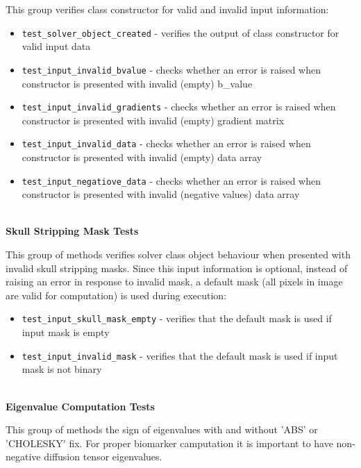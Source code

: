 This group verifies class constructor for valid and invalid input information:

\begin{itemize}
	\item 
	\texttt{test\_solver\_object\_created} - verifies the output of class constructor for valid input data
	
	\item 
	\texttt{test\_input\_invalid\_bvalue} - checks whether an error is raised when constructor is presented with invalid (empty) b\_value
	
	\item 
	\texttt{test\_input\_invalid\_gradients} - checks whether an error is raised when constructor is presented with invalid (empty) gradient matrix
	
	\item 
	\texttt{test\_input\_invalid\_data} - checks whether an error is raised when constructor is presented with invalid (empty) data array
	
	\item 
	\texttt{test\_input\_negatiove\_data} - checks whether an error is raised when constructor is presented with invalid (negative values) data array
\end{itemize}

\hfill\\
\textbf{Skull Stripping Mask Tests}
\hfill

This group of methods verifies solver class object behaviour when presented with invalid skull stripping masks. Since this input information is optional, instead of raising an error in response to invalid mask, a default mask (all pixels in image are valid for computation) is used during execution:

\begin{itemize}
	\item 
	\texttt{test\_input\_skull\_mask\_empty} - verifies that the default mask is used if input mask is empty
	
	\item 
	\texttt{test\_input\_invalid\_mask} - verifies that the default mask is used if input mask is not binary
\end{itemize}

\hfill\\
\textbf{Eigenvalue Computation Tests}
\hfill

This group of methods the sign of eigenvalues with and without 'ABS' or 'CHOLESKY' fix. For proper biomarker camputation it is important to have non-negative diffusion tensor eigenvalues.


